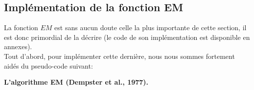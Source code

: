 \documentclass[a4paper,french,10pt]{article}
\begin{document}
\newpage

\subsection{Implémentation de la fonction EM}
La fonction $EM$ est sans aucun doute celle la plus importante de cette section, il est donc primordial de la décrire (le code de son implémentation est disponible en annexes).\\ 
Tout d'abord, pour implémenter cette dernière, nous nous sommes fortement aidés du pseudo-code suivant:


\begin{algorithm}
	\caption{\textbf{L’algorithme EM (Dempster et al., 1977).}}
	\begin{algorithmic}[1]
		\ENSURE
		\ENDWHILE
	\end{algorithmic}
\end{algorithm}
\end{document}
